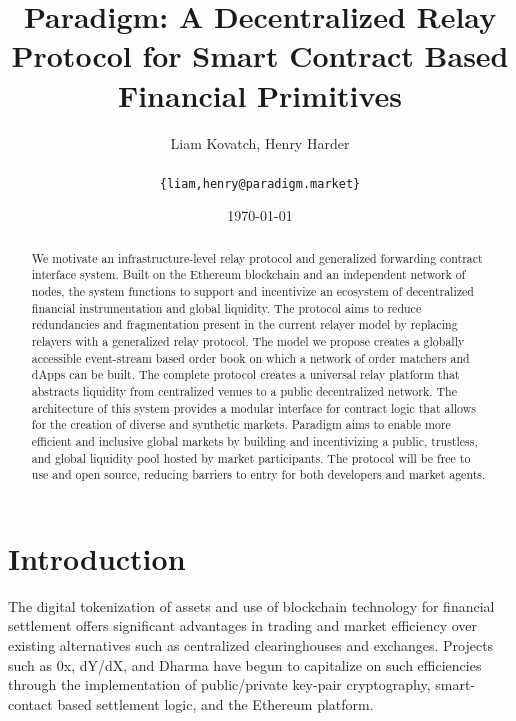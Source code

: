 \documentclass[9pt]{article}
\begin{document}
\title{ \textbf{Paradigm: A Decentralized Relay Protocol for Smart Contract Based Financial Primitives} } 
\author{Liam Kovatch, Henry Harder \\ \\ \texttt{\{liam,henry@paradigm.market\}}} 
\date{\today}
\maketitle 


\begin{abstract}

\noindent We motivate an infrastructure-level relay protocol and generalized forwarding contract interface system. Built on the Ethereum blockchain and an independent network of nodes, the system functions to support and incentivize an ecosystem of decentralized financial instrumentation and global liquidity. The protocol aims to reduce redundancies and fragmentation present in the current relayer model by replacing relayers with a generalized relay protocol. The model we propose creates a globally accessible event-stream based order book on which a network of order matchers and dApps can be built. The complete protocol creates a universal relay platform that abstracts liquidity from centralized venues to a public decentralized network. The architecture of this system provides a modular interface for contract logic that allows for the creation of diverse and synthetic markets. Paradigm aims to enable more efficient and inclusive global markets by building and incentivizing a public, trustless, and global liquidity pool hosted by market participants. The protocol will be free to use and open source, reducing barriers to entry for both developers and market agents. \\

\end{abstract}
\pagebreak


\tableofcontents
\pagebreak


\section{Introduction}\label{intro}

\noindent The digital tokenization of assets and use of blockchain technology for financial settlement offers significant advantages in trading and market efficiency over existing alternatives such as centralized clearinghouses and exchanges\cite{defi}. Projects such as 0x\cite{0xwhitepaper}, dY/dX\cite{dydxwhitepaper}, and Dharma\cite{dharmawhitepaper} have begun to capitalize on such efficiencies through the implementation of public/private key-pair cryptography, smart-contact based settlement logic, and the Ethereum platform. \\
\end{document}
